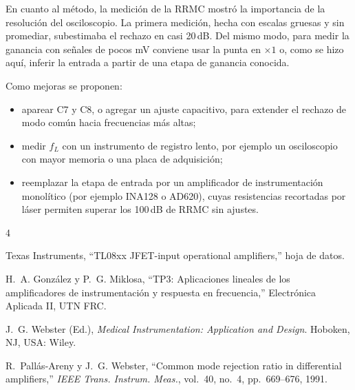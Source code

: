 \documentclass[journal,a4paper]{IEEEtran}
\begin{document}
En cuanto al método, la medición de la RRMC mostró la importancia de la resolución del osciloscopio. La primera medición, hecha con escalas gruesas y sin promediar, subestimaba el rechazo en casi 20\,dB. Del mismo modo, para medir la ganancia con señales de pocos mV conviene usar la punta en $\times 1$ o, como se hizo aquí, inferir la entrada a partir de una etapa de ganancia conocida.

Como mejoras se proponen:
\begin{itemize}
\item aparear C7 y C8, o agregar un ajuste capacitivo, para extender el rechazo de modo común hacia frecuencias más altas;
\item medir $f_L$ con un instrumento de registro lento, por ejemplo un osciloscopio con mayor memoria o una placa de adquisición;
\item reemplazar la etapa de entrada por un amplificador de instrumentación monolítico (por ejemplo INA128 o AD620), cuyas resistencias recortadas por láser permiten superar los 100\,dB de RRMC sin ajustes.
\end{itemize}

\begin{thebibliography}{4}

Texas Instruments, ``TL08xx JFET-input operational amplifiers,'' hoja de datos.

H.~A. González y P.~G. Miklosa, ``TP3: Aplicaciones lineales de los amplificadores de instrumentación y respuesta en frecuencia,'' Electrónica Aplicada II, UTN FRC.

J.~G. Webster (Ed.), \emph{Medical Instrumentation: Application and Design}. Hoboken, NJ, USA: Wiley.

R.~Pallás-Areny y J.~G. Webster, ``Common mode rejection ratio in differential amplifiers,'' \emph{IEEE Trans. Instrum. Meas.}, vol.~40, no.~4, pp.~669--676, 1991.

\end{thebibliography}
\end{document}
